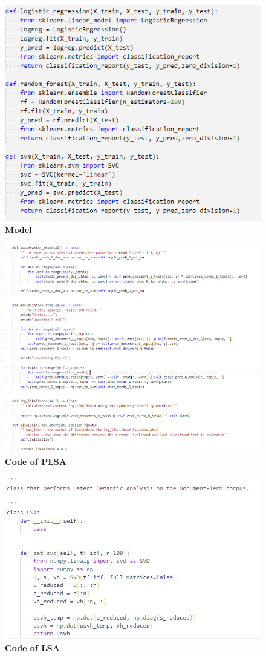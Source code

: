 \documentclass[12pt]{report}
\begin{document}
    \begin{figure}[h]
        \centering
        \includegraphics[scale=0.8]{model.png}
        \caption{\textbf{Model}}
    \end{figure}
    \begin{figure}[h]
        \centering
        \includegraphics[scale=0.4]{plsaCode.png}
        \caption{\textbf{Code of PLSA}}
    \end{figure}
    \begin{figure}[h]
        \centering
        \includegraphics{lsaCode.jpg}
        \caption{\textbf{Code of LSA}}
    \end{figure}
    
\end{document}
